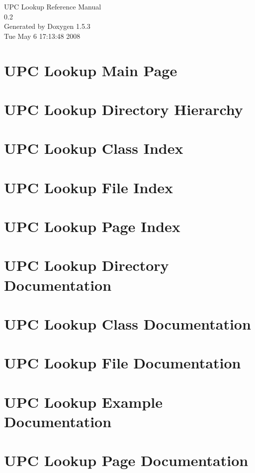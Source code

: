 \documentclass[letterpaper]{book}
\begin{document}
\begin{titlepage}
\vspace*{7cm}
\begin{center}
{\Large UPC Lookup Reference Manual\\[1ex]\large 0.2 }\\
\vspace*{1cm}
{\large Generated by Doxygen 1.5.3}\\
\vspace*{0.5cm}
{\small Tue May 6 17:13:48 2008}\\
\end{center}
\end{titlepage}
\clearemptydoublepage
{}
\tableofcontents
\clearemptydoublepage
{}
\chapter{UPC Lookup Main Page}
\label{index}\hypertarget{index}{}
\chapter{UPC Lookup Directory Hierarchy}

\chapter{UPC Lookup Class Index}

\chapter{UPC Lookup File Index}

\chapter{UPC Lookup Page Index}

\chapter{UPC Lookup Directory Documentation}

\chapter{UPC Lookup Class Documentation}

\chapter{UPC Lookup File Documentation}












\chapter{UPC Lookup Example Documentation}

\chapter{UPC Lookup Page Documentation}





\printindex
\end{document}
